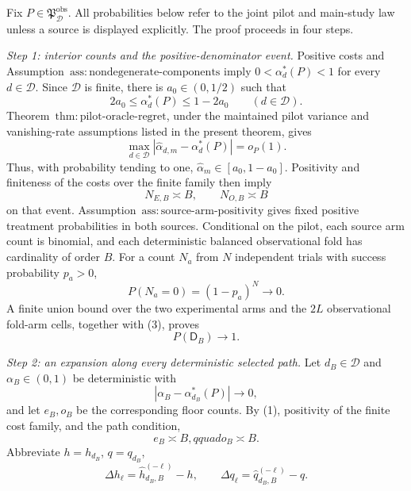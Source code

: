 Fix \(P\in\mathfrak P_{\mathcal D}^{\mathrm{obs}}\).  All probabilities below refer to the joint pilot and main-study law unless a source is displayed explicitly.  The proof proceeds in four steps.

\emph{Step 1: interior counts and the positive-denominator event.}
Positive costs and Assumption~\(\mathrm{ass{:}nondegenerate\text{-}components}\) imply
\(0<\alpha_d^*(P)<1\) for every \(d\in\mathcal D\).  Since \(\mathcal D\) is finite, there is \(a_0\in(0,1/2)\) such that
\[
 2a_0\le\alpha_d^*(P)\le1-2a_0
 \qquad(d\in\mathcal D). \tag{1}
\]
Theorem~\(\mathrm{thm{:}pilot\text{-}oracle\text{-}regret}\), under the maintained pilot variance and vanishing-rate assumptions listed in the present theorem, gives
\[
 \max_{d\in\mathcal D}
 |\widehat\alpha_{d,m}-\alpha_d^*(P)|=o_P(1). \tag{2}
\]
Thus, with probability tending to one,
\(\widehat\alpha_m\in[a_0,1-a_0]\).  Positivity and finiteness of the costs over the finite family then imply
\[
 N_{E,B}\asymp B,\qquad N_{O,B}\asymp B \tag{3}
\]
on that event.  Assumption~\(\mathrm{ass{:}source\text{-}arm\text{-}positivity}\) gives fixed positive treatment probabilities in both sources.  Conditional on the pilot, each source arm count is binomial, and each deterministic balanced observational fold has cardinality of order \(B\).  For a count \(N_a\) from \(N\) independent trials with success probability \(p_a>0\),
\[
 P(N_a=0)=(1-p_a)^N\longrightarrow0.
\]
A finite union bound over the two experimental arms and the \(2L\) observational fold-arm cells, together with (3), proves
\[
 P(\mathsf D_B)\longrightarrow1. \tag{4}
\]

\emph{Step 2: an expansion along every deterministic selected path.}
Let \(d_B\in\mathcal D\) and \(\alpha_B\in(0,1)\) be deterministic with
\[
 |\alpha_B-\alpha_{d_B}^*(P)|\longrightarrow0,
\]
and let \(e_B,o_B\) be the corresponding floor counts.  By (1), positivity of the finite cost family, and the path condition,
\[
 e_B\asymp B,qquad o_B\asymp B. \tag{5}
\]
Abbreviate \(h=h_{d_B}\), \(q=q_{d_B}\),
\[
 \Delta h_\ell=\widehat h_{d_B,B}^{(-\ell)}-h,
 \qquad
 \Delta q_\ell=\widehat q_{d_B,B}^{(-\ell)}-q.
\]

